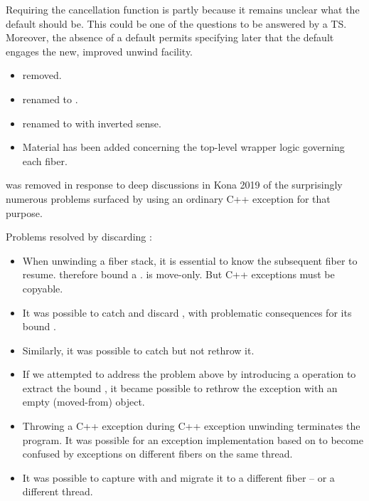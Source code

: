 Requiring the cancellation function is partly because it remains unclear what
the default should be. This could be one of the questions to be answered by a
TS. Moreover, the absence of a default permits specifying later that the
default engages the new, improved unwind facility.


\begin{itemize}
    \item {} removed.
    \item {} renamed to
      \canxtresume.
    \item {} renamed to \emptyfn with inverted
      sense.
    \item Material has been added concerning the top-level wrapper
      logic governing each fiber.
\end{itemize}

\unwindex was removed in response to deep
discussions in Kona 2019 of the surprisingly numerous problems surfaced by
using an ordinary C++ exception for that purpose.

Problems resolved by discarding \unwindex:
\begin{itemize}
    \item When unwinding a fiber stack, it is essential to know the subsequent
          fiber to resume. \unwindex therefore bound a \fiber. \fiber is
          move-only. But C++ exceptions must be copyable.
    \item It was possible to catch and discard \unwindex, with problematic
          consequences for its bound \fiber.
    \item Similarly, it was possible to catch \unwindex but not rethrow it.
    \item If we attempted to address the problem above by introducing a
          \unwindex operation to extract the bound \fiber, it became possible
          to rethrow the exception with an empty (moved-from) \fiber object.
    \item Throwing a C++ exception during C++ exception unwinding terminates
          the program. It was possible for an exception implementation based
          on  to become confused by exceptions on different
          fibers on the same thread.
    \item It was possible to capture \unwindex with 
          and migrate it to a different fiber -- or a different thread.
\end{itemize}
